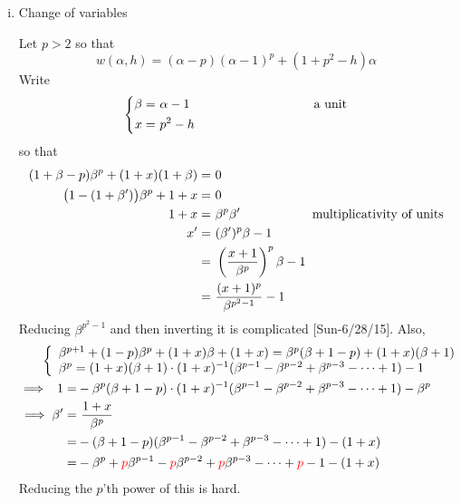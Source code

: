 \documentclass{rs}
\theoremstyle{definition}
\theoremstyle{remark}
\newcommand{\A}{\alpha}
\newcommand{\B}{\beta}
\renewcommand{\=}{\approx}
\renewcommand{\-}{\sim}
\newcommand{\rd}[1]{\textcolor{red}{#1}}
\numberwithin{equation}{section}
\numberwithin{thm}{section}
\begin{document}
\begin{enumerate}[(i)]
 \item Change of variables 

 Let $p > 2$ so that 
 \[
  w(\A,h) = (\A - p) (\A - 1)^p + (1 + p^2 - h) \A 
 \]
 Write 
 \[
  \left\{
  \begin{split}
   \B = & ~ \A - 1 \hskip 3.45cm \text{a unit} \\
    x = & ~ p^2 - h 
  \end{split}
  \right.
 \]
 so that 
 \[
  \begin{split}
   (1 + \B - p) \B^p + (1 + x) (1 + \B) = & ~ 0 \\
   \big( 1 - (1 + \B') \big) \B^p + 1 + x = & ~ 0 \\
   1 + x = & ~ \B^p \B' \hskip 2cm \text{multiplicativity of units} \\
   x' = & ~ (\B')^p \B - 1 \\
      = & ~ \left( \frac{x + 1}{\B^p} \right)^p \B - 1 \\
      = & ~ \frac{(x + 1)^p}{\B^{p^2 - 1}} - 1 
  \end{split}
 \]
 Reducing $\B^{p^2 - 1}$ and then inverting it is complicated [Sun-6/28/15].  Also, 
 \[
  \begin{split}
   & \hskip -1cm \left\{
     \begin{array}{l}
      \B^{p + 1} + (1 - p) \B^p + (1 + x) \B + (1 + x) = \B^p (\B + 1 - p) + (1 + x) (\B + 1) \\
      \B^p = (1 + x) (\B + 1) \cdot (1 + x)^{-1} (\B^{p - 1} - \B^{p - 2} + \B^{p - 3} - \cdots + 1) - 1 
     \end{array}
     \right. \\
   \implies ~\, 1 = & -\B^p (\B + 1 - p) \cdot (1 + x)^{-1} (\B^{p - 1} - \B^{p - 2} + \B^{p - 3} - \cdots + 1) - \B^p \\
     \implies \B' = & ~ \frac{1 + x}{\B^p} \\
                  = & -(\B + 1 - p) (\B^{p - 1} - \B^{p - 2} + \B^{p - 3} - \cdots + 1) - (1 + x) \\
                  = & -\B^p + \rd{p} \B^{p - 1} - \rd{p} \B^{p - 2} + \rd{p} \B^{p - 3} - \cdots + \rd{p} - 1 - (1 + x) 
  \end{split}
 \]
 Reducing the $p$'th power of this is hard.  


\end{enumerate}
\end{document}
